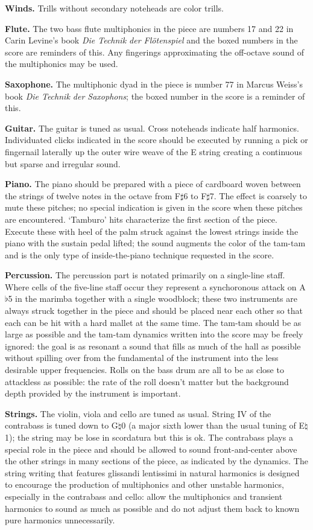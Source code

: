 \documentclass[10pt]{article}
\begin{document}
\begin{textblock}{23}
\textbf{Winds.} Trills without secondary noteheads are color trills.

\textbf{Flute.} The two bass flute multiphonics in the piece are numbers 17 and
22 in Carin Levine's book \textit{Die Technik der Flötenspiel} and the boxed
numbers in the score are reminders of this. Any fingerings approximating the
off-octave sound of the multiphonics may be used.

\textbf{Saxophone.} The multiphonic dyad in the piece is number 77 in Marcus
Weiss's book \textit{Die Technik der Saxophons}; the boxed number in the score
is a reminder of this.

\textbf{Guitar.} The guitar is tuned as usual. Cross noteheads indicate half
harmonics. Individuated clicks indicated in the score should be executed by
running a pick or fingernail laterally up the outer wire weave of the E string
creating a continuous but sparse and irregular sound.

\textbf{Piano.} The piano should be prepared with a piece of cardboard woven
between the strings of twelve notes in the octave from F$\sharp$6 to
F$\sharp$7. The effect is coarsely to mute these pitches; no special indication
is given in the score when these pitches are encountered. `Tamburo' hits
characterize the first section of the piece. Execute these with heel of the
palm struck against the lowest strings inside the piano with the sustain pedal
lifted; the sound augments the color of the tam-tam and is the only type of
inside-the-piano technique requested in the score.

\textbf{Percussion.} The percussion part is notated primarily on a single-line
staff. Where cells of the five-line staff occur they represent a synchoronous
attack on A$\flat$5 in the marimba together with a single woodblock; these two
instruments are always struck together in the piece and should be placed near
each other so that each can be hit with a hard mallet at the same time. The
tam-tam should be as large as possible and the tam-tam dynamics written into
the score may be freely ignored: the goal is as resonant a sound that fills as
much of the hall as possible without spilling over from the fundamental of the
instrument into the less desirable upper frequencies. Rolls on the bass drum
are all to be as close to attackless as possible: the rate of the roll doesn't
matter but the background depth provided by the instrument is important.

\textbf{Strings.} The violin, viola and cello are tuned as usual. String IV of
the contrabass is tuned down to G$\natural$0 (a major sixth lower than the
usual tuning of E$\natural$1); the string may be lose in scordatura but this is
ok. The contrabass plays a special role in the piece and should be allowed to
sound front-and-center above the other strings in many sections of the piece,
as indicated by the dynamics. The string writing that features glissandi
lentissimi in natural harmonics is designed to encourage the production of
multiphonics and other unstable harmonics, especially in the contrabass and
cello: allow the multiphonics and transient harmonics to sound as much as
possible and do not adjust them back to known pure harmonics unnecessarily.


\end{textblock}
\end{document}
